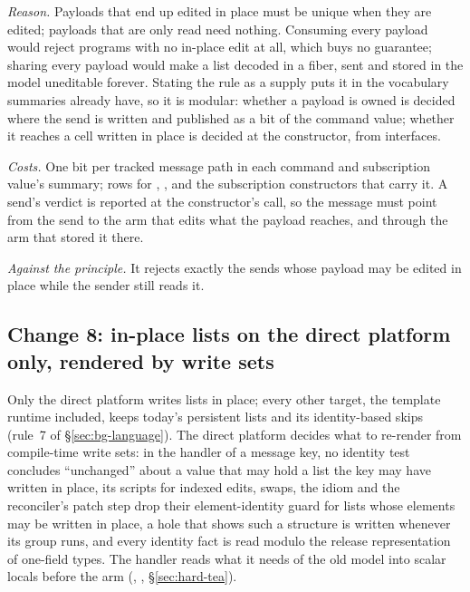 \emph{Reason.} Payloads that end up edited in place must be unique when they are edited; payloads that are
only read need nothing. Consuming every payload would reject programs with no in-place edit at all, which
buys no guarantee; sharing every payload would make a list decoded in a fiber, sent and stored in the model
uneditable forever. Stating the rule as a supply puts it in the vocabulary summaries already have, so it is
modular: whether a payload is owned is decided where the send is written and published as a bit of the
command value; whether it reaches a cell written in place is decided at the constructor, from interfaces.

\emph{Costs.} One bit per tracked message path in each command and subscription value's summary; rows for
, ,  and the subscription constructors that carry it. A send's
verdict is reported at the constructor's call, so the message must point from the send to the arm that
edits what the payload reaches, and through the arm that stored it there.

\emph{Against the principle.} It rejects exactly the sends whose payload may be edited in place while the
sender still reads it.

\subsection*{Change 8: in-place lists on the direct platform only, rendered by write sets}

Only the direct platform writes lists in place; every other target, the template runtime included, keeps
today's persistent lists and its identity-based skips (rule~7 of \S\ref{sec:bg-language}). The direct
platform decides what to re-render from compile-time write sets: in the handler of a message key, no
identity test concludes ``unchanged'' about a value that may hold a list the key may have written in place,
its scripts for indexed edits, swaps, the  idiom and the reconciler's patch step drop their
element-identity guard for lists whose elements may be written in place, a hole that shows such a
structure is written whenever its group runs, and every identity fact is read modulo the release
representation of one-field types. The handler reads what it needs of the old model into scalar locals
before the arm (, , \S\ref{sec:hard-tea}).

